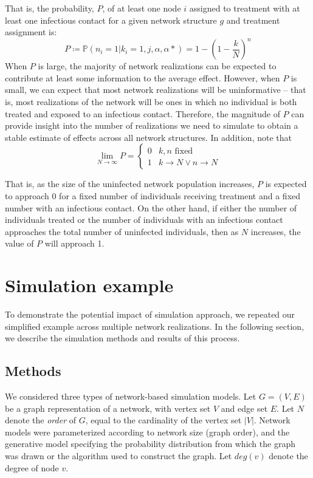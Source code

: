 \documentclass{article}
\theoremstyle{definition}
\begin{document}
That is, the probability, $P$, of at least one node $i$ assigned to treatment with at least one infectious contact for a given network structure $g$ and treatment assignment is:
\begin{equation}\label{eq:18}
    P \coloneqq \mathbb{P}\left(n_{i}=1 \vert k_{i}=1,j,\alpha,\alpha*\right)=1-\left(1-\frac{k}{N}\right)^{n}
\end{equation}
When $P$ is large, the majority of network realizations can be expected to contribute at least some information to the average effect. However, when $P$ is small, we can expect that most network realizations will be uninformative -- that is, most realizations of the network will be ones in which no individual is both treated and exposed to an infectious contact. Therefore, the magnitude of $P$ can provide insight into the number of realizations we need to simulate to obtain a stable estimate of effects across all network structures. In addition, note that
\begin{equation}\label{eq:19}
    \lim_{N \to \infty}P=\begin{cases}0 & k,n \text{ fixed} \\ 1 & k \to N \lor n \to N  \end{cases}
\end{equation}

That is, as the size of the uninfected network population increases, $P$ is expected to approach 0 for a fixed number of individuals receiving treatment and a fixed number with an infectious contact. On the other hand, if either the number of individuals treated or the number of individuals with an infectious contact approaches the total number of uninfected individuals, then as $N$ increases, the value of $P$ will approach 1.

\section{Simulation example}
To demonstrate the potential impact of simulation approach, we repeated our simplified example across multiple network realizations. In the following section, we describe the simulation methods and results of this process.

 \subsection{Methods}
We considered three types of network-based simulation models. Let $G=(V,E)$ be a graph representation of a network, with vertex set $V$ and edge set $E$. Let $N$ denote the \textit{order} of $G$, equal to the cardinality of the vertex set $\vert V \vert$. Network models were parameterized according to network size (graph order), and the generative model specifying the probability distribution from which the graph was drawn or the algorithm used to construct the graph. Let $deg(v)$ denote the degree of node $v$.
\end{document}
